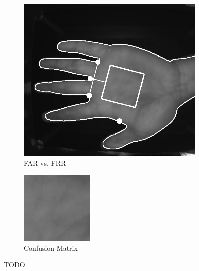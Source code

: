 \begin{enumerate}
    \begin{figure}[!ht]
        \centering
        \begin{subfigure}[t]{0.48\columnwidth}
            \includegraphics[width=\textwidth]{./images/preprocessing/far_points_line_perpendicular_square_image.png}
            \caption{FAR vs. FRR}
            \label{fig:far_vs_frr}
        \end{subfigure}
        \hfill
        \begin{subfigure}[t]{0.48\columnwidth}
            \includegraphics[width=\textwidth]{./images/preprocessing/rectified_image.png}
            \caption{Confusion Matrix}
            \label{fig:confusion_matrix}
        \end{subfigure}
        \caption{TODO}
        \label{fig:far_frr_confusion}
    \end{figure}


\end{enumerate}

